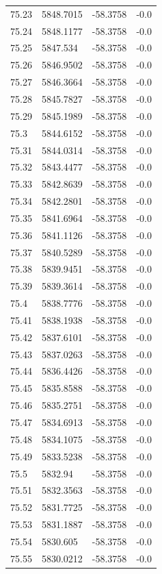 \begin{table}[H]
\begin{tabular}{llll}
75.23 & 5848.7015 & -58.3758 & -0.0 \\
75.24 & 5848.1177 & -58.3758 & -0.0 \\
75.25 & 5847.534 & -58.3758 & -0.0 \\
75.26 & 5846.9502 & -58.3758 & -0.0 \\
75.27 & 5846.3664 & -58.3758 & -0.0 \\
75.28 & 5845.7827 & -58.3758 & -0.0 \\
75.29 & 5845.1989 & -58.3758 & -0.0 \\
75.3 & 5844.6152 & -58.3758 & -0.0 \\
75.31 & 5844.0314 & -58.3758 & -0.0 \\
75.32 & 5843.4477 & -58.3758 & -0.0 \\
75.33 & 5842.8639 & -58.3758 & -0.0 \\
75.34 & 5842.2801 & -58.3758 & -0.0 \\
75.35 & 5841.6964 & -58.3758 & -0.0 \\
75.36 & 5841.1126 & -58.3758 & -0.0 \\
75.37 & 5840.5289 & -58.3758 & -0.0 \\
75.38 & 5839.9451 & -58.3758 & -0.0 \\
75.39 & 5839.3614 & -58.3758 & -0.0 \\
75.4 & 5838.7776 & -58.3758 & -0.0 \\
75.41 & 5838.1938 & -58.3758 & -0.0 \\
75.42 & 5837.6101 & -58.3758 & -0.0 \\
75.43 & 5837.0263 & -58.3758 & -0.0 \\
75.44 & 5836.4426 & -58.3758 & -0.0 \\
75.45 & 5835.8588 & -58.3758 & -0.0 \\
75.46 & 5835.2751 & -58.3758 & -0.0 \\
75.47 & 5834.6913 & -58.3758 & -0.0 \\
75.48 & 5834.1075 & -58.3758 & -0.0 \\
75.49 & 5833.5238 & -58.3758 & -0.0 \\
75.5 & 5832.94 & -58.3758 & -0.0 \\
75.51 & 5832.3563 & -58.3758 & -0.0 \\
75.52 & 5831.7725 & -58.3758 & -0.0 \\
75.53 & 5831.1887 & -58.3758 & -0.0 \\
75.54 & 5830.605 & -58.3758 & -0.0 \\
75.55 & 5830.0212 & -58.3758 & -0.0 \\

\end{tabular}
\end{table}
